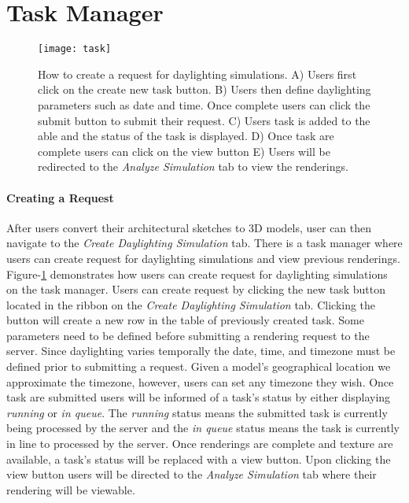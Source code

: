 \section{Task Manager}

	\begin{figure}[t]
	\centering
	\texttt{[image: task]}
	\caption{How to create a request for daylighting simulations. 
		A) Users first click on the create new task button.
		B) Users then define daylighting parameters such as date and time. Once complete users can click the submit button to submit their request.
		C) Users task is added to the able and the status of the task is displayed.
		D) Once task are complete users can click on the view button
		E) Users will be redirected to the \textit{Analyze Simulation} tab to view the renderings.
	}
	\label{fig:task}
	\end{figure}


	\paragraph{Creating a Request}
	After users convert their architectural sketches to 3D models, user can then navigate to the \textit{Create Daylighting Simulation} tab.
	There is a task manager where users can create request for daylighting simulations and view previous renderings.
	Figure-\ref{fig:task} demonstrates how users can create request for daylighting simulations on the task manager.
	Users can create request by clicking the new task button located in the ribbon on the \textit{Create Daylighting Simulation} tab.
	Clicking the button will create a new row in the table of previously created task. 
	Some parameters need to be defined before submitting a rendering request to the server.
	Since daylighting varies temporally the date, time, and timezone must be defined prior to submitting a request.
	Given a model's geographical location we approximate the timezone, however, users can set any timezone they wish.
	Once task are submitted users will be informed of a task's status by either displaying \textit{running} or \textit{in queue}.
	The \textit{running} status means the submitted task is currently being processed by the server and the \textit{in queue} status means the task is currently in line to processed by the server.
	Once renderings are complete and texture are available, a task's status will be replaced with a view button.
	Upon clicking the view button users will be directed to the \textit{Analyze Simulation} tab where their rendering will be viewable.

